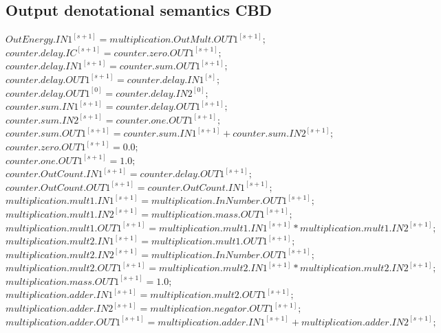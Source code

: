 \documentclass{article}
\begin{document}
\begin{appendices}
\section{Output denotational semantics CBD}
\label{appendix:oef3}
\(OutEnergy.IN1^{[s+1]} = multiplication.OutMult.OUT1^{[s+1]};\)\\
\(counter.delay.IC^{[s+1]} = counter.zero.OUT1^{[s+1]};\)\\
\(counter.delay.IN1^{[s+1]} = counter.sum.OUT1^{[s+1]};\)\\
\(counter.delay.OUT1^{[s+1]} = counter.delay.IN1^{[s]};\)\\
\(counter.delay.OUT1^{[0]} = counter.delay.IN2^{[0]};\)\\
\(counter.sum.IN1^{[s+1]} = counter.delay.OUT1^{[s+1]};\)\\
\(counter.sum.IN2^{[s+1]} = counter.one.OUT1^{[s+1]};\)\\
\(counter.sum.OUT1^{[s+1]} = counter.sum.IN1^{[s+1]} + counter.sum.IN2^{[s+1]};\)\\
\(counter.zero.OUT1^{[s+1]} = 0.0;\)\\
\(counter.one.OUT1^{[s+1]} = 1.0;\)\\
\(counter.OutCount.IN1^{[s+1]} = counter.delay.OUT1^{[s+1]};\)\\
\(counter.OutCount.OUT1^{[s+1]} = counter.OutCount.IN1^{[s+1]};\)\\
\(multiplication.mult1.IN1^{[s+1]} = multiplication.InNumber.OUT1^{[s+1]};\)\\
\(multiplication.mult1.IN2^{[s+1]} = multiplication.mass.OUT1^{[s+1]};\)\\
\(multiplication.mult1.OUT1^{[s+1]} = multiplication.mult1.IN1^{[s+1]} * multiplication.mult1.IN2^{[s+1]};\)\\
\(multiplication.mult2.IN1^{[s+1]} = multiplication.mult1.OUT1^{[s+1]};\)\\
\(multiplication.mult2.IN2^{[s+1]} = multiplication.InNumber.OUT1^{[s+1]};\)\\
\(multiplication.mult2.OUT1^{[s+1]} = multiplication.mult2.IN1^{[s+1]} * multiplication.mult2.IN2^{[s+1]};\)\\
\(multiplication.mass.OUT1^{[s+1]} = 1.0;\)\\
\(multiplication.adder.IN1^{[s+1]} = multiplication.mult2.OUT1^{[s+1]};\)\\
\(multiplication.adder.IN2^{[s+1]} = multiplication.negator.OUT1^{[s+1]};\)\\
\(multiplication.adder.OUT1^{[s+1]} = multiplication.adder.IN1^{[s+1]} + multiplication.adder.IN2^{[s+1]};\)\\

\end{appendices}
\end{document}
